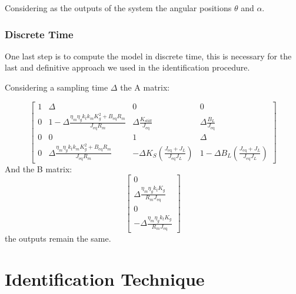                 Considering as the outputs of the system the angular positions $\theta$ and $\alpha$.

            \subsubsection{Discrete Time}
                One last step is to compute the model in discrete time, this is necessary for the last and definitive approach we used in the identification procedure.

                Considering a sampling time $\Delta$ the A matrix:

                \begin{equation*}
                    \left\lbrack \begin{array}{cccc}
                        1 & \Delta  & 0 & 0\\
                        0 & 1-\Delta \frac{\eta_m \eta_g k_t k_m K_g^2 +B_{\mathrm{eq}} R_m }{J_{\mathrm{eq}} R_m } & \Delta \frac{K_{\mathrm{stiff}} }{J_{\mathrm{eq}} } & \Delta \frac{B_L }{J_{\mathrm{eq}} }\\
                        0 & 0 & 1 & \Delta \\
                        0 & \Delta \frac{\eta_m \eta_g k_t k_m K_g^2 +B_{\mathrm{eq}} R_m }{J_{\mathrm{eq}} R_m } & -{\Delta K}_S \left(\frac{J_{\mathrm{eq}} +J_{L} }{J_{\mathrm{eq}} J_{L} }\right) & 1-{\Delta B}_L \left(\frac{J_{\mathrm{eq}} +J_{L} }{J_{\mathrm{eq}} J_{L} }\right)
                    \end{array}\right\rbrack 
                \end{equation*}
                And the B matrix:       
                \begin{equation*}
                    \left\lbrack\begin{array}{c}
                        0\\
                        \Delta \frac{\eta_m \eta_g k_t K_g }{R_m J_{\mathrm{eq}} }\\
                        0\\
                        -\Delta \frac{\eta_m \eta_g k_t K_g }{R_m J_{\mathrm{eq}} }
                    \end{array}\right\rbrack
                \end{equation*}
                the outputs remain the same.

    \section{Identification Technique}

